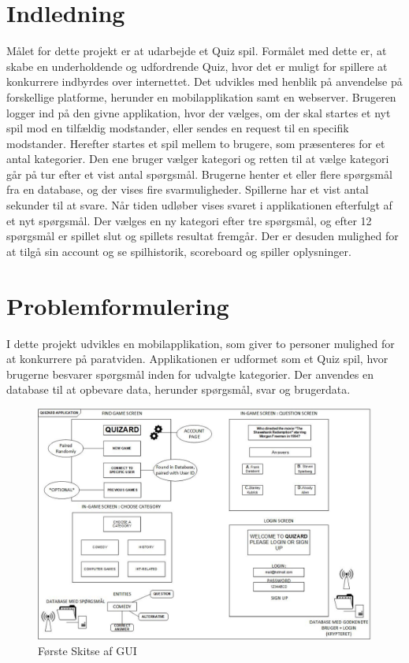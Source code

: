\documentclass[a4paper,12pt,fleqn,oneside]{article}
\begin{document}

\section{Indledning}
Målet for dette projekt er at udarbejde et Quiz spil. Formålet med dette er, at skabe en underholdende og udfordrende Quiz, hvor det er muligt for spillere at konkurrere indbyrdes over internettet. Det udvikles med henblik på anvendelse på forskellige platforme, herunder en mobilapplikation samt en webserver. Brugeren logger ind på den givne applikation, hvor der vælges, om der skal startes et nyt spil mod en tilfældig modstander, eller sendes en request til en specifik modstander. Herefter startes et spil mellem to brugere, som præsenteres for et antal kategorier. Den ene bruger vælger kategori og retten til at vælge kategori går på tur efter et vist antal spørgsmål. Brugerne henter et eller flere spørgsmål fra en database, og der vises fire svarmuligheder. Spillerne har et vist antal sekunder til at svare. Når tiden udløber vises svaret i applikationen efterfulgt af et nyt spørgsmål. Der vælges en ny kategori efter tre spørgsmål, og efter 12 spørgsmål er spillet slut og spillets resultat fremgår. Der er desuden mulighed for at tilgå sin account og se spilhistorik, scoreboard og spiller oplysninger.

\section{Problemformulering}
I dette projekt udvikles en mobilapplikation, som giver to personer mulighed for at konkurrere på paratviden. Applikationen er udformet som et Quiz spil, hvor brugerne besvarer spørgsmål inden for udvalgte kategorier. Der anvendes en database til at opbevare data, herunder spørgsmål, svar og brugerdata. 

\begin{figure}[H]
    \centering
    \includegraphics[width=\textwidth]{Projektformulering/graphic/1Skitse.jpg}
    \caption{Første Skitse af GUI}
    \label{fig:1_GUI}
\end{figure}
\end{document}
